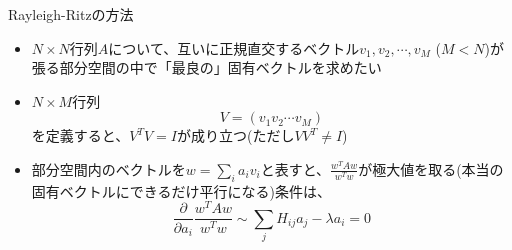 \begin{frame}[t,fragile]{Rayleigh-Ritzの方法}
  \begin{itemize}
    \setlength{\itemsep}{1em}
  \item $N \times N$行列$A$について、互いに正規直交するベクトル$v_1,v_2,\cdots,v_M$ ($M < N$)が張る部分空間の中で「最良の」固有ベクトルを求めたい
  \item $N \times M$行列
    \[
    V=(v_1 v_2 \cdots v_M)
    \]
    を定義すると、$V^TV=I$が成り立つ(ただし$VV^T \ne I$)
  \item 部分空間内のベクトルを$w = \sum_i a_i v_i$と表すと、$\frac{w^TAw}{w^Tw}$が極大値を取る(本当の固有ベクトルにできるだけ平行になる)条件は、
    \[
    \frac{\partial}{\partial a_i} \frac{w^TAw}{w^Tw} \sim \sum_j H_{ij}a_j - \lambda a_i = 0
    \]
  \end{itemize}
\end{frame}
